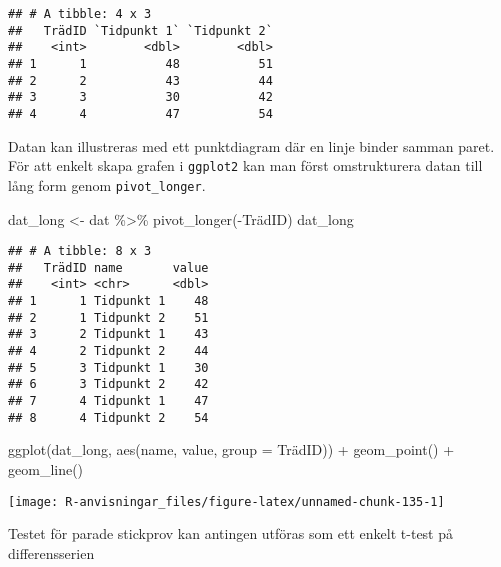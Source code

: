 \documentclass[
]{book}
\newenvironment{Shaded}{\begin{snugshade}}{\end{snugshade}}
\newcommand{\AttributeTok}[1]{\textcolor[rgb]{0.77,0.63,0.00}{#1}}
\newcommand{\FunctionTok}[1]{\textcolor[rgb]{0.00,0.00,0.00}{#1}}
\newcommand{\NormalTok}[1]{#1}
\newcommand{\OtherTok}[1]{\textcolor[rgb]{0.56,0.35,0.01}{#1}}
\newcommand{\SpecialCharTok}[1]{\textcolor[rgb]{0.00,0.00,0.00}{#1}}
\newcommand{\StringTok}[1]{\textcolor[rgb]{0.31,0.60,0.02}{#1}}
\theoremstyle{definition}
\theoremstyle{definition}
\theoremstyle{definition}
\theoremstyle{definition}
\theoremstyle{remark}
\begin{document}
\begin{verbatim}
## # A tibble: 4 x 3
##   TrädID `Tidpunkt 1` `Tidpunkt 2`
##    <int>        <dbl>        <dbl>
## 1      1           48           51
## 2      2           43           44
## 3      3           30           42
## 4      4           47           54
\end{verbatim}

Datan kan illustreras med ett punktdiagram där en linje binder samman paret. För att enkelt skapa grafen i \texttt{ggplot2} kan man först omstrukturera datan till lång form genom \texttt{pivot\_longer}.

\begin{Shaded}
\begin{Highlighting}[]
\NormalTok{dat\_long }\OtherTok{\textless{}{-}}\NormalTok{ dat }\SpecialCharTok{\%\textgreater{}\%} \FunctionTok{pivot\_longer}\NormalTok{(}\SpecialCharTok{{-}}\NormalTok{TrädID)}
\NormalTok{dat\_long}
\end{Highlighting}
\end{Shaded}

\begin{verbatim}
## # A tibble: 8 x 3
##   TrädID name       value
##    <int> <chr>      <dbl>
## 1      1 Tidpunkt 1    48
## 2      1 Tidpunkt 2    51
## 3      2 Tidpunkt 1    43
## 4      2 Tidpunkt 2    44
## 5      3 Tidpunkt 1    30
## 6      3 Tidpunkt 2    42
## 7      4 Tidpunkt 1    47
## 8      4 Tidpunkt 2    54
\end{verbatim}

\begin{Shaded}
\begin{Highlighting}[]
\FunctionTok{ggplot}\NormalTok{(dat\_long, }\FunctionTok{aes}\NormalTok{(name, value, }\AttributeTok{group =}\NormalTok{ TrädID)) }\SpecialCharTok{+}
  \FunctionTok{geom\_point}\NormalTok{() }\SpecialCharTok{+}
  \FunctionTok{geom\_line}\NormalTok{()}
\end{Highlighting}
\end{Shaded}

\begin{center}\texttt{[image: R-anvisningar\_files/figure-latex/unnamed-chunk-135-1]} \end{center}

Testet för parade stickprov kan antingen utföras som ett enkelt t-test på differensserien

\begin{Shaded}
\end{Shaded}
\end{document}
